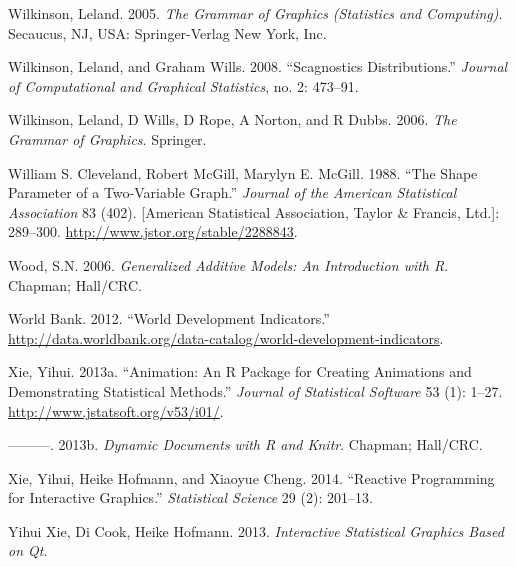 \documentclass[12pt,]{isuthesis}
\begin{document}
\hypertarget{ref-Wilkinson:2005}{}
Wilkinson, Leland. 2005. \emph{The Grammar of Graphics (Statistics and
Computing)}. Secaucus, NJ, USA: Springer-Verlag New York, Inc.

\hypertarget{ref-Wilkinson:2008}{}
Wilkinson, Leland, and Graham Wills. 2008. ``Scagnostics
Distributions.'' \emph{Journal of Computational and Graphical
Statistics}, no. 2: 473--91.

\hypertarget{ref-wilkinson}{}
Wilkinson, Leland, D Wills, D Rope, A Norton, and R Dubbs. 2006.
\emph{The Grammar of Graphics}. Springer.

\hypertarget{ref-banking}{}
William S. Cleveland, Robert McGill, Marylyn E. McGill. 1988. ``The
Shape Parameter of a Two-Variable Graph.'' \emph{Journal of the American
Statistical Association} 83 (402). {[}American Statistical Association,
Taylor \& Francis, Ltd.{]}: 289--300.
\url{http://www.jstor.org/stable/2288843}.

\hypertarget{ref-mgcv}{}
Wood, S.N. 2006. \emph{Generalized Additive Models: An Introduction with
R}. Chapman; Hall/CRC.

\hypertarget{ref-WorldBank}{}
World Bank. 2012. ``World Development Indicators.''
\url{http://data.worldbank.org/data-catalog/world-development-indicators}.

\hypertarget{ref-animation}{}
Xie, Yihui. 2013a. ``Animation: An R Package for Creating Animations and
Demonstrating Statistical Methods.'' \emph{Journal of Statistical
Software} 53 (1): 1--27. \url{http://www.jstatsoft.org/v53/i01/}.

\hypertarget{ref-knitr}{}
---------. 2013b. \emph{Dynamic Documents with R and Knitr}. Chapman;
Hall/CRC.

\hypertarget{ref-Xie:2014co}{}
Xie, Yihui, Heike Hofmann, and Xiaoyue Cheng. 2014. ``Reactive
Programming for Interactive Graphics.'' \emph{Statistical Science} 29
(2): 201--13.

\hypertarget{ref-cranvas}{}
Yihui Xie, Di Cook, Heike Hofmann. 2013. \emph{Interactive Statistical
Graphics Based on Qt}.



\end{document}
